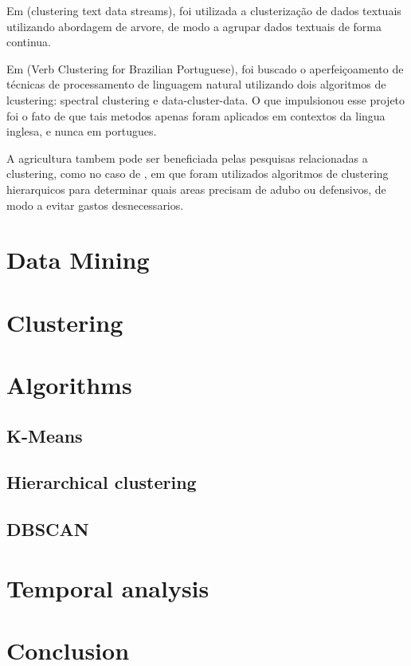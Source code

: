 \documentclass[12pt]{article}
\begin{document}
Em (clustering text data streams), foi utilizada a clusterização de dados textuais utilizando abordagem de arvore, de modo a agrupar dados textuais de forma continua.

Em (Verb Clustering for Brazilian Portuguese), foi buscado o aperfeiçoamento de técnicas de processamento de linguagem natural utilizando dois algoritmos de lcustering: spectral clustering e data-cluster-data. O que impulsionou esse projeto foi o fato de que tais metodos apenas foram aplicados em contextos da lingua inglesa, e nunca em portugues.


A agricultura tambem pode ser beneficiada pelas pesquisas relacionadas a clustering, como no caso de \cite{trevisan}, em que foram utilizados algoritmos de clustering hierarquicos para determinar quais areas precisam de adubo ou defensivos, de modo a evitar gastos desnecessarios.

\section{Data Mining}

\section{Clustering}

\section{Algorithms}

\subsection{K-Means}

\subsection{Hierarchical clustering}

\subsection{DBSCAN}

\section{Temporal analysis}

\section{Conclusion}



\end{document}
